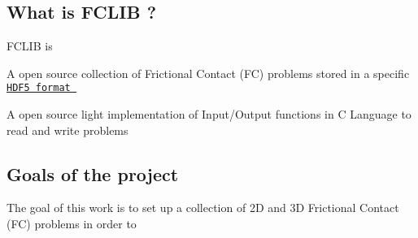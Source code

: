 \hypertarget{index_whatis}{}\subsection{What is F\+C\+L\+I\+B ?}\label{index_whatis}
F\+C\+L\+I\+B is 
\begin{DoxyItemize}
\item A open source collection of Frictional Contact (F\+C) problems stored in a specific \href{http://www.hdfgroup.org/HDF5/}{\tt H\+D\+F5 format } 
\item A open source light implementation of Input/\+Output functions in C Language to read and write problems  
\end{DoxyItemize}\hypertarget{index_goals}{}\subsection{Goals of the project}\label{index_goals}
The goal of this work is to set up a collection of 2\+D and 3\+D Frictional Contact (F\+C) problems in order to


